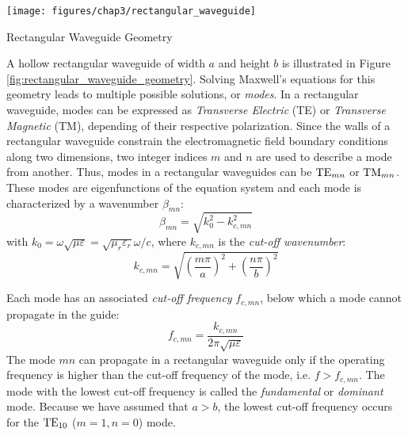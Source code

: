 \begin{marginfigure}[0cm]
	\texttt{[image: figures/chap3/rectangular\_waveguide]}
	\caption{Rectangular Waveguide Geometry}
	\label{fig:rectangular_waveguide_geometry}
\end{marginfigure}

A hollow rectangular waveguide of width $a$ and height $b$ is illustrated in Figure \ref{fig:rectangular_waveguide_geometry}. Solving Maxwell’s equations for this geometry leads to multiple possible solutions, or \emph{modes}. In a rectangular waveguide, modes can be expressed as \emph{Transverse Electric} (TE) or \emph{Transverse Magnetic} (TM), depending of their respective polarization. Since the walls of a rectangular waveguide constrain the electromagnetic field boundary conditions along two dimensions, two integer indices $m$ and $n$ are used to describe a mode from another. Thus, modes in a rectangular waveguides can be ${\mathrm{TE}}_{mn}$ or ${\mathrm{TM}}_{mn}$. These modes are eigenfunctions of the equation system and each mode is characterized by a wavenumber $\beta_{mn}$:
\begin{equation}
	\beta_{mn} = \sqrt{k^2_0 - k_{c,mn}^2 }
	\label{eq:rectwg_wavenumber}
\end{equation}
with $k_0=\omega\sqrt{\mu\varepsilon}=\sqrt{\mu_r \varepsilon_{r}}\omega/c$, where $k_{c,mn}$ is the \textit{cut-off wavenumber}:
\begin{equation}
	k_{c,mn}
	=
	\sqrt{\left(\frac{m\pi}{a}\right)^{2}+\left(\frac{n\pi}{b}\right)^{2}}
	\label{eq:rectwg_cutoff_wavenumber}
\end{equation}

Each mode has an associated \textit{cut-off frequency} $f_{c,mn}$, below which a mode cannot propagate in the guide:
\begin{equation}
	f_{c,mn} = \frac{k_{c,mn}}{2\pi\sqrt{\mu \varepsilon}}
	\label{eq:rectwg_cutoff-frequency}
\end{equation}
The mode $mn$ can propagate in a rectangular waveguide only if the operating frequency is higher than the cut-off frequency of the mode, i.e. $f>f_{c,mn}$. The mode with the lowest cut-off frequency is called the \textit{fundamental} or \textit{dominant} mode. Because we have assumed that $a>b$, the lowest cut-off frequency occurs for the ${\mathrm{TE}}_{10}$ ($m=1,n=0$) mode. 

